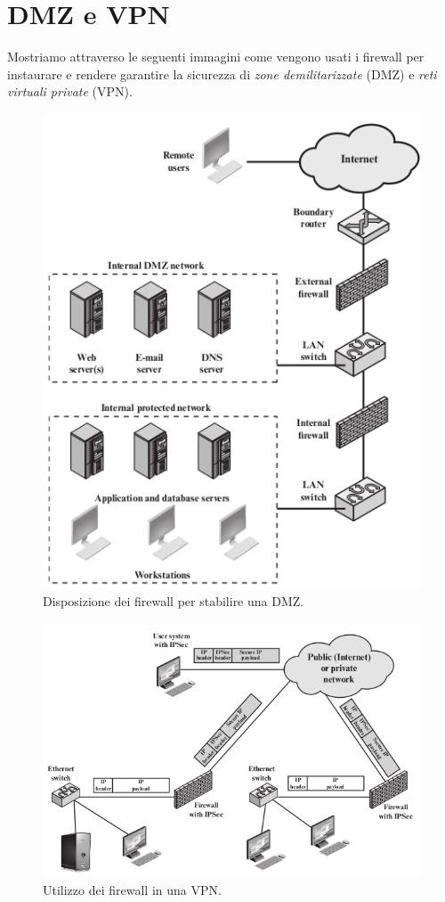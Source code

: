 \documentclass[a4paper, 11pt, twoside, openright, fleqn]{report}
\begin{document}
\section{DMZ e VPN}
Mostriamo attraverso le seguenti immagini come vengono usati i firewall per instaurare e rendere garantire la sicurezza di \emph{zone demilitarizzate} (DMZ) e \emph{reti virtuali private} (VPN).
\begin{figure}
	\centering
	\includegraphics[width=.7\textwidth]{images/firewallSchema}
	\caption{Disposizione dei firewall per stabilire una DMZ.}
\end{figure}
\begin{figure}
	\centering
	\includegraphics[width=.9\textwidth]{images/VPN}
	\caption{Utilizzo dei firewall in una VPN.}
\end{figure}
\end{document}
